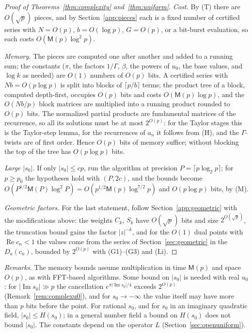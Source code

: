 \documentclass[11pt,reqno]{amsart}
\theoremstyle{definition}
\theoremstyle{remark}
\newcommand{\Mul}{\mathsf{M}}
\begin{document}
\begin{small}
\begin{proof}[Proof of Theorems~\ref{thm:complexity} and~\ref{thm:uniform}]
\emph{Cost.} By (T) there are $O(\sqrt p)$ pieces, and by Section~\ref{app:pieces} each is a fixed number of certified
series with $N = O(p)$, $b = O(\log p)$, $G = O(p)$, or a bit-burst evaluation, so each costs $O(\Mul(p)\log^2p)$.

\emph{Memory.} The pieces are computed one after another and added to a running sum; the constants ($\pi$, the factors
$1/\Gamma$, $\beta$, the powers of $u_0$, the base values, and $\log k$ as needed) are $O(1)$ numbers of $O(p)$ bits.
A certified series with $Nb = O(p\log p)$ is split into blocks of $\lceil p/b\rceil$ terms; the product tree of a
block, computed depth-first, occupies $O(p)$ bits and costs $O(\Mul(p)\log p)$, and the $O(Nb/p)$ block matrices are
multiplied into a running product rounded to $O(p)$ bits. The normalized partial products are fundamental matrices
of the recurrence, so all its solutions must be at most $2^{O(p)}$: for the Taylor stages this is the Taylor-step
lemma, for the recurrences of $a_n$ it follows from (H), and the $\Gamma$-twists are of first order. Hence $O(p)$ bits
of memory suffice; without blocking the top of the tree has $O(p\log p)$ bits.

\emph{Large $|s_0|$.} If only $|s_0| \le cp$, run the algorithm at precision $P = \lceil p\log_2p\rceil$; for
$p \ge p_0$ the hypotheses hold with $(P, 2c)$, and the bounds become $O(P^{1/2}\Mul(P)\log^2P) =
O(p^{1/2}\Mul(p)\log^{7/2}p)$ and $O(p\log p)$ bits, by (M).

\emph{Geometric factors.} For the last statement, follow Section~\ref{app:geometric} with the modifications above: the
weights $C_k$, $S_k$ have $O(\sqrt p)$ bits and size $2^{O(\sqrt p)}$, the truncation bound gains the factor
$|z|^{-k}$, and for the $O(1)$ dual points with $\operatorname{Re}c_n < 1$ the values come from the series of
Section~\ref{sec:geometric} in the $D_a(c_n)$, bounded by $2^{O(p)}$ with (G1)--(G3) and (Li).
\end{proof}

\emph{Remarks.} The memory bounds assume multiplication in time $\Mul(p)$ and space $O(p)$, as with FFT-based
algorithms. Some bound on $|s_0|$ is needed with real $u_0$: for $|\operatorname{Im}s_0| \gg p$ the cancellation
$e^{\pi|\operatorname{Im}s_0|/4}$ exceeds $2^{O(p)}$ (Remark~\ref{rem:complexu0}), and for $s_0 \to -\infty$ the value
itself may have more than $p$ bits before the point. For rational $s_0$, and for $s_0$ in an imaginary quadratic
field, $|s_0| \le H(s_0)$; in a general number field a bound on $H(s_0)$ does not bound $|s_0|$. The constants depend
on the operator $L$ (Section~\ref{sec:openuniform}).


\end{small}
\end{document}
